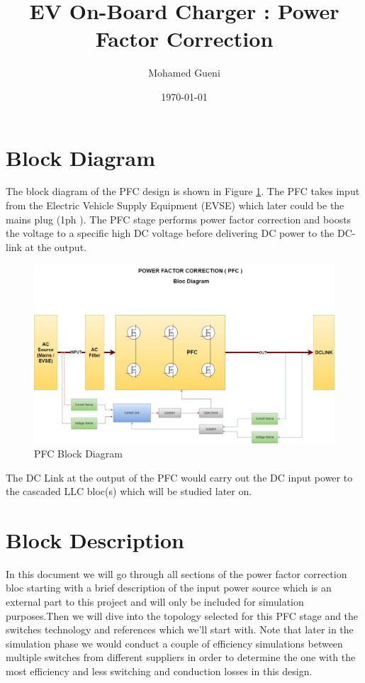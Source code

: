 \documentclass{article}
\begin{document}
\title{EV On-Board Charger : Power Factor Correction}
\author{Mohamed Gueni}
\date{\today}
\maketitle
\section{Block Diagram}

The block diagram of the PFC design is shown in Figure \ref{fig:PFC}. The PFC takes input from the Electric Vehicle Supply Equipment (EVSE) which later could be the mains plug (1ph ).
The PFC stage performs power factor correction and boosts the voltage to a specific high DC voltage before delivering DC power to the DC-link at the output.

\begin{figure}[htbp]
    \centering
    \includegraphics[width=\textwidth]{PFC.jpg}
    \caption{PFC Block Diagram}
    \label{fig:PFC}
\end{figure}
The DC Link at the output of the PFC would carry out the DC input power to the cascaded LLC bloc(s) which will be studied later on.
\section{Block Description}
In this document we will go through all sections of the power factor correction bloc starting with a brief description of the input power source which is an external part to this project and will only be included for simulation purposes.Then we will dive into the topology selected for this PFC stage and the switches technology and references which we'll start with.
Note that later in the simulation phase we would conduct a couple of efficiency simulations between multiple switches from different suppliers in order to determine the one with the most efficiency and less switching and conduction losses in this design.
\end{document}

